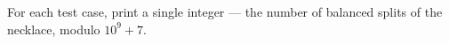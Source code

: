 For each test case, print a single integer --- the number of balanced splits of the necklace, modulo $10^9 + 7$.
